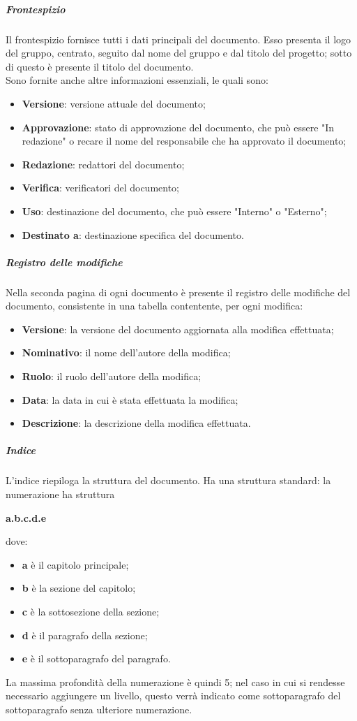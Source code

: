 \documentclass[../norme-di-progetto.tex]{subfiles}
\begin{document}
\subparagraph{Frontespizio}
Il frontespizio fornisce tutti i dati principali del documento. Esso presenta il logo del gruppo, centrato, seguito dal nome del gruppo e dal titolo del progetto; sotto di questo è presente il titolo del documento. \\
Sono fornite anche altre informazioni essenziali, le quali sono:
\begin{itemize}
  \item \textbf{Versione}: versione attuale del documento;
  \item \textbf{Approvazione}: stato di approvazione del documento, che può essere "In redazione" o recare il nome del responsabile che ha approvato il documento;
  \item \textbf{Redazione}: redattori del documento;
  \item \textbf{Verifica}: verificatori del documento;
  \item \textbf{Uso}: destinazione del documento, che può essere "Interno" o "Esterno";
  \item \textbf{Destinato a}: destinazione specifica del documento.
\end{itemize}
\subparagraph{Registro delle modifiche}
Nella seconda pagina di ogni documento è presente il registro delle modifiche del documento, consistente in una tabella contentente, per ogni modifica:
\begin{itemize}
  \item \textbf{Versione}: la versione del documento aggiornata alla modifica effettuata;
  \item \textbf{Nominativo}: il nome dell'autore della modifica;
  \item \textbf{Ruolo}: il ruolo dell'autore della modifica;
  \item \textbf{Data}: la data in cui è stata effettuata la modifica;
  \item \textbf{Descrizione}: la descrizione della modifica effettuata.
\end{itemize}
\subparagraph{Indice}
L'indice riepiloga la struttura del documento. Ha una struttura standard: la numerazione ha struttura \begin{center}
  \centering
  \textbf{a.b.c.d.e}
\end{center} dove:
\begin{itemize}
  \item \textbf{a} è il capitolo principale;
  \item \textbf{b} è la sezione del capitolo;
  \item \textbf{c} è la sottosezione della sezione;
  \item \textbf{d} è il paragrafo della sezione;
  \item \textbf{e} è il sottoparagrafo del paragrafo.
\end{itemize}
La massima profondità della numerazione è quindi 5; nel caso in cui si rendesse necessario aggiungere un livello, questo verrà indicato come sottoparagrafo del sottoparagrafo senza ulteriore numerazione.
\end{document}
